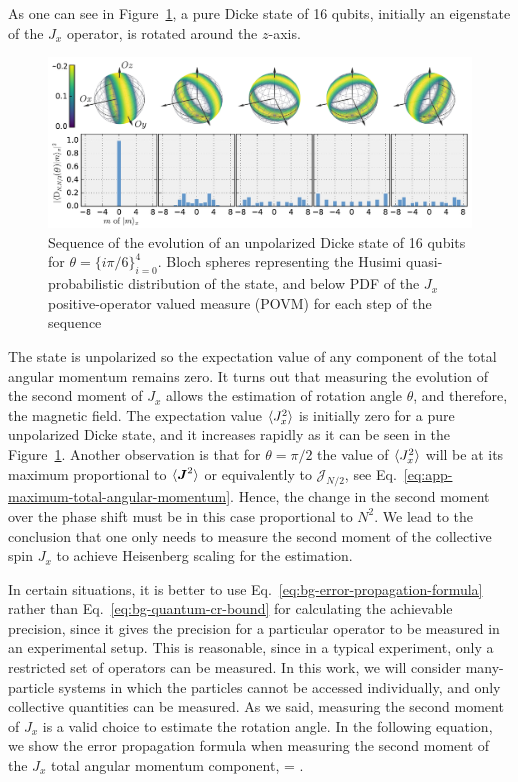 As one can see in Figure~\ref{fig:vd-secuence-evo}, a pure Dicke state of 16 qubits, initially an eigenstate of the $J_x$ operator, is rotated around the $z$-axis.
\begin{figure}[htp]
  \centering
  \includegraphics[scale=.65]{img/VD_evolution_of_dicke.pdf}
  \caption[Sequence of Dicke state evolution]{Sequence of the evolution of an unpolarized Dicke state of 16 qubits for $\theta=\{i\pi/6\}_{i=0}^4$. Bloch spheres representing the Husimi quasi-probabilistic distribution of the state, and below PDF of the $J_x$ positive-operator valued measure (POVM) for each step of the sequence}
  \label{fig:vd-secuence-evo}
\end{figure}
The state is unpolarized so the expectation value of any component of the total angular momentum remains zero.
It turns out that measuring the evolution of the second moment of $J_x$ allows the estimation of rotation angle $\theta$, and therefore, the magnetic field.
The expectation value $\langle{J_x^2}\rangle$ is initially zero for a pure unpolarized Dicke state, and it increases rapidly as it can be seen in the Figure~\ref{fig:vd-secuence-evo}.
Another observation is that for $\theta=\pi/2$ the value of $\langle{J_x^2}\rangle$ will be at its maximum proportional to $\langle{\ensuremath{\boldsymbol{J}}^2}\rangle$ or equivalently to $\mathcal{J}_{N/2}$, see Eq.~\eqref{eq:app-maximum-total-angular-momentum}.
Hence, the change in the second moment over the phase shift must be in this case proportional to $N^2$.
We lead to the conclusion that one only needs to measure the second moment of the collective spin $J_x$ to achieve Heisenberg scaling for the estimation.

In certain situations, it is better to use Eq.~\eqref{eq:bg-error-propagation-formula} rather than Eq.~\eqref{eq:bg-quantum-cr-bound} for calculating the achievable precision, since it gives the precision for a particular operator to be measured in an experimental setup.
This is reasonable, since in a typical experiment, only a restricted set of operators can be measured.
In this work, we will consider many-particle systems in which the particles cannot be accessed individually, and only collective quantities can be measured.
As we said, measuring the second moment of $J_x$ is a valid choice to estimate the rotation angle.
In the following equation, we show the error propagation formula when measuring the second moment of the $J_x$ total angular momentum component,
\be
  \varinv{\theta} = .
  \label{eq:vd-error-propagation}
\ee

